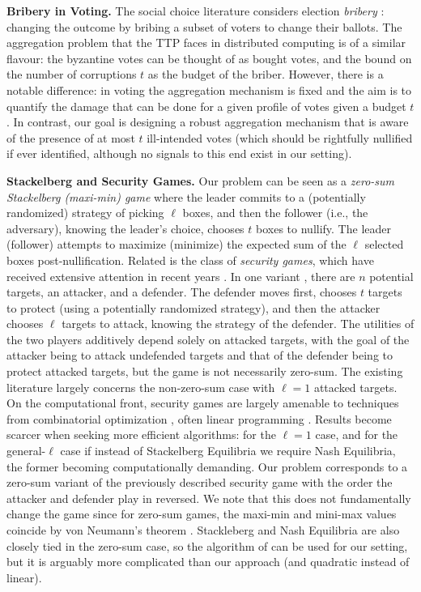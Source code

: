 \documentclass[sigconf,nonacm]{aamas}
\begin{document}
\noindent \textbf{Bribery in Voting.} The social choice literature considers election \emph{bribery} \cite{Faliszewski_Rothe_2016}: changing the outcome 
by bribing a subset of voters to change their ballots. The aggregation problem that the TTP faces in distributed computing is of a similar flavour: the byzantine votes can be thought of as bought votes, and the bound on the number of corruptions $t$ as the budget of the briber. However, there is a notable difference: in voting the aggregation mechanism is fixed and the aim is to quantify the damage that can be done for a given profile of votes given a budget $t$. In contrast, our goal is designing a robust aggregation mechanism that is aware of the presence of at most $t$ ill-intended votes (which should be rightfully nullified if ever identified, although no signals to this end exist in our setting).

\noindent \textbf{Stackelberg and Security Games.} Our problem can be seen as a \emph{zero-sum Stackelberg (maxi-min) game} where the leader commits to a (potentially randomized) strategy of picking $\ell$ boxes, and then the follower (i.e., the adversary), knowing the leader's choice, chooses $t$ boxes to nullify. The leader (follower) attempts to maximize (minimize) the expected sum of the $\ell$ selected boxes post-nullification.
Related is the class of \emph{security games}, which have received extensive attention in recent years \cite{security_survey}. In one variant \cite{security_multiple_attackers}, there are $n$ potential targets, an attacker, and a defender. The defender moves first, chooses $t$ targets to protect (using a potentially randomized strategy), and then the attacker chooses $\ell$ targets to attack, knowing the strategy of the defender. The utilities of the two players additively depend solely on attacked targets, with the goal of the attacker being to attack undefended targets and that of the defender being to protect attacked
targets, but the game is not necessarily zero-sum. The existing literature largely concerns the non-zero-sum case with $\ell = 1$ attacked targets. On the computational front, security games are largely amenable to techniques from combinatorial optimization \cite{security_versus_combinatorial}, often linear programming \cite{conitzer_lp_security}. Results become scarcer when seeking more efficient algorithms: \cite{origami} for the $\ell = 1$ case, and \cite{security_multiple_attackers} for the general-$\ell$ case if instead of Stackelberg Equilibria we require Nash Equilibria, the former becoming computationally demanding. Our problem corresponds to a zero-sum variant of the previously described security game with the order the attacker and defender play in reversed. We note that this does not fundamentally change the game since for zero-sum games, the maxi-min and mini-max values coincide by von Neumann's theorem \cite{Neumann1928}. Stackleberg and Nash Equilibria are also closely tied in the zero-sum case, so the algorithm of \cite{security_multiple_attackers} can be used for our setting, but it is arguably more complicated than our approach (and quadratic instead of linear).
\end{document}
